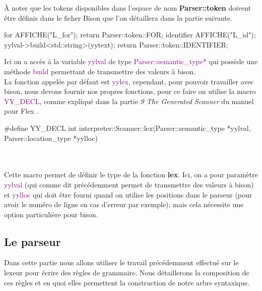 \documentclass[a4paper]{article}%
\begin{document}
À noter que les tokens disponibles dans l'espace de nom \textbf{Parser::token}
doivent être définis dans le ficher Bison que l'on détaillera dans la partie
suivante.

\begin{code}
for          { AFFICHE("L_for"); return Parser::token::FOR; }
{identifier} {
  AFFICHE("L_id");
  yylval->build<std::string>(yytext);
  return Parser::token::IDENTIFIER;
}
\end{code}\leavevmode\newline

\noindent

Ici on a accès à la variable \textcolor{purple}{yylval} de type
\textcolor{purple}{Parser::semantic\_type*} qui possède une méthode
\textcolor{purple}{build} permettant de transmettre des valeurs à bison.\\

La fonction appelée par défaut est \textcolor{purple}{yylex}, cependant, pour
pouvoir travailler avec bison, nous devons fournir nos propres fonctions, pour
ce faire on utilise la macro \textcolor{purple}{YY\_DECL}, comme expliqué dans
la partie \textit{9 The Generated Scanner} du manuel pour Flex
\cite{flexmanual}.

\begin{code}
#define YY_DECL int interpreter::Scanner::lex(Parser::semantic_type *yylval, Parser::location_type *yylloc)
\end{code}\leavevmode\\~\\

Cette macro permet de définir le type de la fonction \textbf{lex}. Ici,
on a pour paramètre \textcolor{purple}{yylval} (qui comme dit précédemment permet
de transmettre des valeurs à bison) et \textcolor{purple}{yylloc} qui doit être
fourni quand on utilise les positions dans le parseur (pour avoir le numéro de
ligne en cas d'erreur par exemple), mais cela nécessite une option particulière
pour bison.

\clearpage{}

\subsection{Le parseur}

Dans cette partie nous allons utiliser le travail précédemment effectué sur le
lexeur pour écrire des règles de grammaire. Nous détaillerons la
composition de ces règles et en quoi elles permettent la construction de notre
arbre syntaxique.
\end{document}
